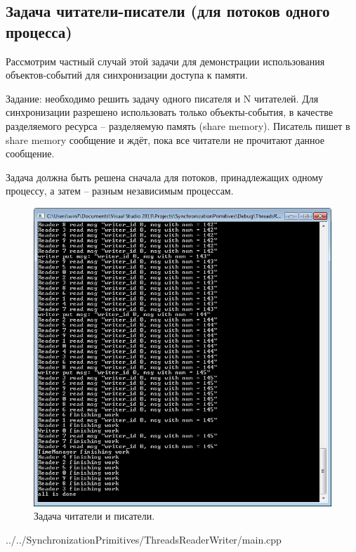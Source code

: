 \documentclass[a4paper, 12pt]{article}		%
\begin{document}
\newpage
\subsection{Задача читатели-писатели (для потоков одного процесса)}

Рассмотрим частный случай этой задачи для демонстрации использования объектов-событий для синхронизации доступа к памяти.


Задание: необходимо решить задачу одного писателя и N читателей. Для синхронизации разрешено использовать только объекты-события, в качестве разделяемого ресурса -- разделяемую память (share memory). Писатель пишет в share memory сообщение и ждёт, пока все читатели не прочитают данное сообщение.

Задача должна быть решена сначала для потоков, принадлежащих одному процессу, а затем – разным независимым процессам.

\begin{figure}[h!]
\centering
\includegraphics[scale=1]{res/006}
\caption{Задача читатели и писатели.}
\end{figure}


{../../SynchronizationPrimitives/ThreadsReaderWriter/main.cpp}
\end{document}
